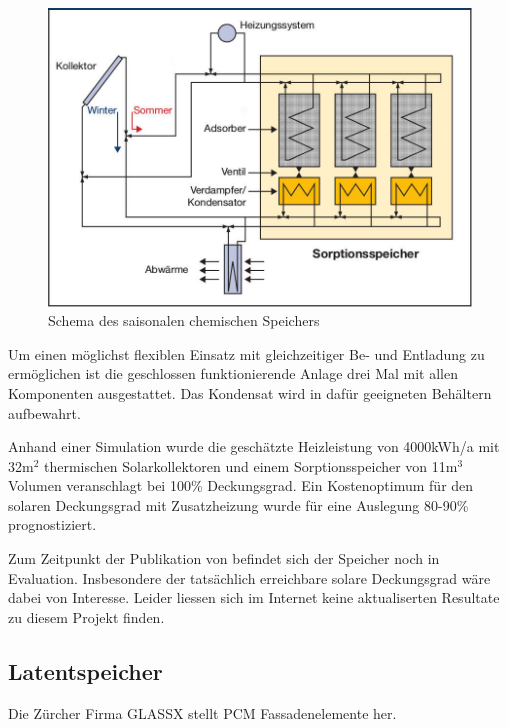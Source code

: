 \documentclass[11pt,a4paper]{scrartcl}
\begin{document}
\begin{figure}[h!]
\begin{center}
\includegraphics[scale=1]{images/energiehaus.jpg}
\caption{Schema des saisonalen chemischen Speichers \cite{BINE2}}
\label{fig:Saisonaler Speicher}
\end{center}
\end{figure}

Um einen möglichst flexiblen Einsatz mit gleichzeitiger Be- und Entladung zu
ermöglichen ist die geschlossen funktionierende Anlage drei Mal mit allen
Komponenten ausgestattet. Das Kondensat wird in dafür geeigneten Behältern
aufbewahrt. 

Anhand einer Simulation wurde die geschätzte Heizleistung von
4000kWh/a mit 32m$^2$ thermischen Solarkollektoren und einem
Sorptionsspeicher von 11m$^3$ Volumen veranschlagt bei 100\% Deckungsgrad. Ein Kostenoptimum für den solaren
Deckungsgrad mit Zusatzheizung wurde für eine Auslegung 80-90\% prognostiziert.

Zum Zeitpunkt der Publikation von \cite{BINE2} befindet sich der Speicher noch
in Evaluation. Insbesondere der tatsächlich erreichbare solare Deckungsgrad wäre
dabei von Interesse. Leider liessen sich im Internet keine aktualiserten
Resultate zu diesem Projekt finden.
\subsection{Latentspeicher}
Die Zürcher Firma GLASSX stellt PCM Fassadenelemente her. 
\end{document}
